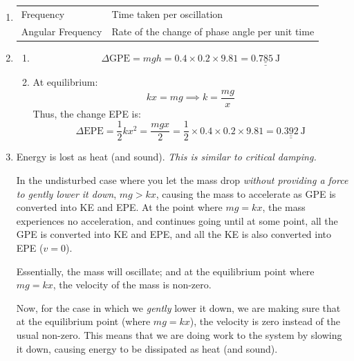 \documentclass[11pt]{article}
\def\doubleunderline#1{\underline{\underline{#1}}}
\begin{document}
\begin{enumerate}[label={[D\arabic*]},itemsep={1em}]
		\item 
			\begin{enumerate}
				\item
					\hspace{0.5em}
					\begin{tabular}{ll}
						\toprule
						Frequency			& Time taken per oscillation \\
						Angular Frequency	& Rate of the change of phase angle per unit time \\
						\bottomrule
					\end{tabular}
					\vspace{0.5em}
				\vfill
				\item 
					\begin{enumerate}
						\item 
							\begin{equation*}
								\Delta\text{GPE} = mgh = 0.4\times 0.2 \times 9.81 = \doubleunderline{\SI{0.785}{\joule}}
							\end{equation*}
						\item 
						
							At equilibrium:
							\begin{equation*}
								kx = mg \implies k = \frac{mg}{x}
							\end{equation*}
							Thus, the change EPE is:
							\begin{equation*}
								\Delta\text{EPE} = \frac{1}{2}kx^2 = \frac{mgx}{2} =  \frac{1}{2} \times 0.4\times 0.2 \times 9.81 = \doubleunderline{\SI{0.392}{\joule}}
							\end{equation*}
					\end{enumerate}
				\vfill
				\item 
					Energy is lost as heat (and sound). \textit{This is similar to critical damping.}
					
					In the undisturbed case where you let the mass drop \textit{without providing a force to gently lower it down}, $mg > kx$, causing the mass to accelerate as GPE is converted into KE and EPE. At the point where $mg = kx$, the mass experiences no acceleration, and continues going until at some point, all the GPE is converted into KE and EPE, and all the KE is also converted into EPE ($v=0$). 
					
					Essentially, the mass will oscillate; and at the equilibrium point where $mg = kx$, the velocity of the mass is non-zero.
					
					Now, for the case in which we \textit{gently} lower it down, we are making sure that at the equilibrium point (where $mg = kx$), the velocity is zero instead of the usual non-zero. This means that we are doing work to the system by slowing it down, causing energy to be dissipated as heat (and sound).
					

\end{enumerate}
\end{enumerate}
\end{document}
